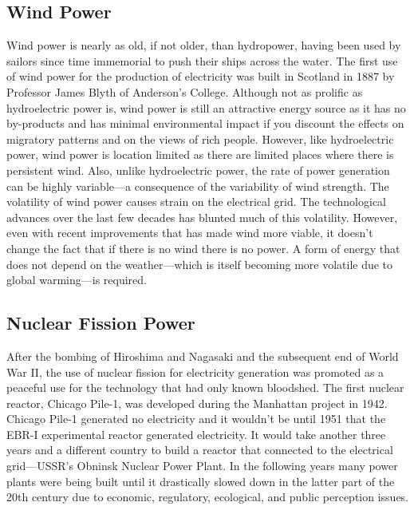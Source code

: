 \subsection{Wind Power}
Wind power is nearly as old, if not older, than hydropower, having been used by sailors since time immemorial to push their ships across the water. The first use of wind power for the production of electricity was built in Scotland in 1887 by Professor James Blyth of Anderson's College\cite{price2005james}. Although not as prolific as hydroelectric power is, wind power is still an attractive energy source as it has no by-products and has minimal environmental impact if you discount the effects on migratory patterns and on the views of rich people\cite{cape_cod_wind}. However, like hydroelectric power, wind power is location limited as there are limited places where there is persistent wind. Also, unlike hydroelectric power, the rate of power generation can be highly variable---a consequence of the variability of wind strength. The volatility of wind power causes strain on the electrical grid. The technological advances over the last few decades has blunted much of this volatility. However, even with recent improvements that has made wind more viable, it doesn't change the fact that if there is no wind there is no power. A form of energy that does not depend on the weather---which is itself becoming more volatile due to global warming---is required.

\subsection{Nuclear Fission Power}
After the bombing of Hiroshima and Nagasaki and the subsequent end of World War II, the use of nuclear fission for electricity generation was promoted as a peaceful use for the technology that had only known bloodshed. The first nuclear reactor, Chicago Pile-1, was developed during the Manhattan project in 1942. Chicago Pile-1 generated no electricity and it wouldn't be until 1951 that the EBR-I experimental reactor generated electricity\cite{doe_nuclearhistory}. It would take another three years and a different country to build a reactor that connected to the electrical grid---USSR's Obninsk Nuclear Power Plant. In the following years many power plants were being built until it drastically slowed down in the latter part of the 20th century due to economic, regulatory, ecological, and public perception issues.

